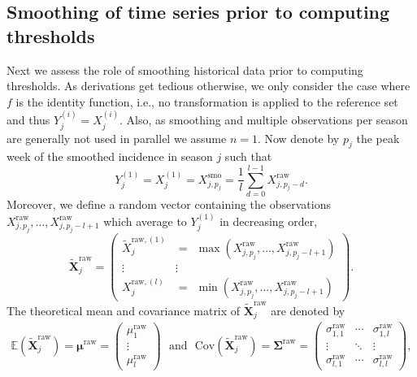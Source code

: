 \documentclass{article}
\begin{document}



\subsection{Smoothing of time series prior to computing thresholds}
\label{subsec:smoothing}

Next we assess the role of smoothing historical data prior to computing thresholds. As derivations get tedious otherwise, we only consider the case where $f$ is the identity function, i.e., no transformation is applied to the reference set and thus $
Y^{(i)}_j = X^{(i)}_j$. Also, as smoothing and multiple observations per season are generally not used in parallel we assume $n = 1$. Now denote by $p_j$ the peak week of the smoothed incidence in season $j$ such that
\begin{equation}
Y_j^{(1)} =  X_j^{(1)} = X^{\text{smo}}_{j, p_j} = \frac{1}{l} \sum_{d = 0}^{l - 1} X^{\text{raw}}_{j, p_j - d}.\label{eq:Y_1_smoothing}
\end{equation}
Moreover, we define a random vector containing the observations $X^{\text{raw}}_{j, p_j}, \dots, X^{\text{raw}}_{j, p_j - l + 1}$ which average to $Y_j^{(1)}$ in decreasing order,
$$
\tilde{\mathbf{X}}^\text{raw}_j = \begin{pmatrix} \tilde{X}_j^{\text{raw}, (1)} & = \ \ \max(X^{\text{raw}}_{j, p_j}, \dots, X^{\text{raw}}_{j, p_j - l + 1}) \\ \vdots & \vdots \\ X_j^{\text{raw}, (l)} & = \ \ \min(X^{\text{raw}}_{j, p_j}, \dots, X^{\text{raw}}_{j, p_j - l + 1}) \end{pmatrix}.
$$
The theoretical mean and covariance matrix of $\tilde{\mathbf{X}}^\text{raw}_j$ are denoted by
\begin{align}
\mathbb{E}\left(\tilde{\mathbf{X}}^\text{raw}_j\right) = \boldsymbol{\mu}^\text{raw} = \left(\begin{array}{c}
\mu^\text{raw}_1\\
\vdots\\
\mu^\text{raw}_l
\end{array}\right) \ \ \ \text{and} \ \ \ \text{Cov}\left(\tilde{\mathbf{X}}^\text{raw}_j\right) = \boldsymbol{\Sigma}^\text{raw} =
\left(\begin{array}{ccc}
\sigma^\text{raw}_{1, 1} & \cdots & \sigma^\text{raw}_{1, l}\\
\vdots & \ddots &\vdots\\
\sigma^\text{raw}_{l, 1} & \cdots & \sigma^\text{raw}_{l, l}
\end{array}\right),
\end{align}
\end{document}
